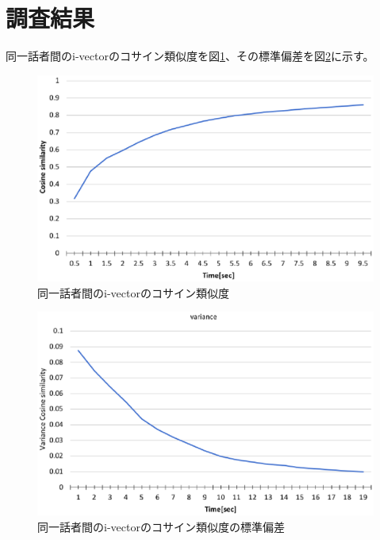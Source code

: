 \section{調査結果}
\par
同一話者間のi-vectorのコサイン類似度を図\ref{fig:same_cos_hist}、その標準偏差を図\ref{fig:same_cos_vari}に示す。\par

\begin{figure}[H]
  \begin{center}
    \includegraphics[scale=0.8]{./figure/same_cos_hist.eps}
  \end{center}
  \caption{同一話者間のi-vectorのコサイン類似度 \label{fig:same_cos_hist}}
\end{figure}

\begin{figure}[H]
  \begin{center}
    \includegraphics[scale=0.8]{./figure/same_cos_vari.eps}
  \end{center}
  \caption{同一話者間のi-vectorのコサイン類似度の標準偏差 \label{fig:same_cos_vari}}
\end{figure}


